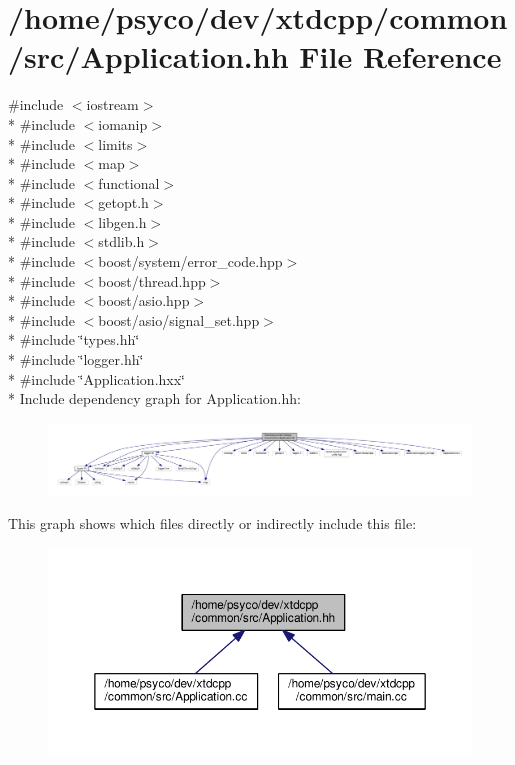 \hypertarget{src_2Application_8hh}{}\section{/home/psyco/dev/xtdcpp/common/src/\+Application.hh File Reference}
\label{src_2Application_8hh}
{\ttfamily \#include $<$iostream$>$}\\*
{\ttfamily \#include $<$iomanip$>$}\\*
{\ttfamily \#include $<$limits$>$}\\*
{\ttfamily \#include $<$map$>$}\\*
{\ttfamily \#include $<$functional$>$}\\*
{\ttfamily \#include $<$getopt.\+h$>$}\\*
{\ttfamily \#include $<$libgen.\+h$>$}\\*
{\ttfamily \#include $<$stdlib.\+h$>$}\\*
{\ttfamily \#include $<$boost/system/error\+\_\+code.\+hpp$>$}\\*
{\ttfamily \#include $<$boost/thread.\+hpp$>$}\\*
{\ttfamily \#include $<$boost/asio.\+hpp$>$}\\*
{\ttfamily \#include $<$boost/asio/signal\+\_\+set.\+hpp$>$}\\*
{\ttfamily \#include \char`\"{}types.\+hh\char`\"{}}\\*
{\ttfamily \#include \char`\"{}logger.\+hh\char`\"{}}\\*
{\ttfamily \#include \char`\"{}Application.\+hxx\char`\"{}}\\*
Include dependency graph for Application.\+hh\+:
\nopagebreak
\begin{figure}[H]
\begin{center}
\leavevmode
\includegraphics[width=350pt]{src_2Application_8hh__incl}
\end{center}
\end{figure}
This graph shows which files directly or indirectly include this file\+:
\nopagebreak
\begin{figure}[H]
\begin{center}
\leavevmode
\includegraphics[width=350pt]{src_2Application_8hh__dep__incl}
\end{center}
\end{figure}
